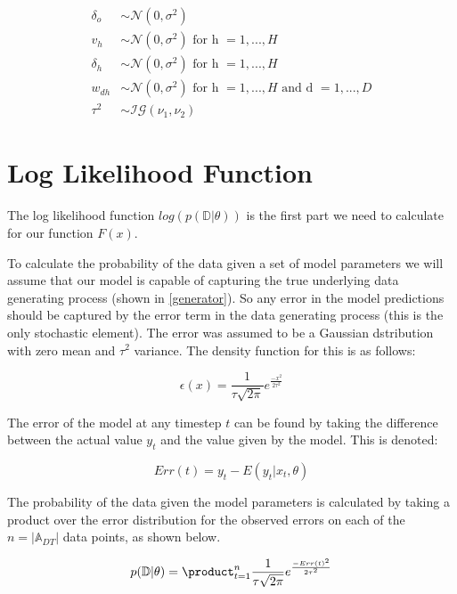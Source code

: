 \documentclass[12pt,a4paper]{article}
\numberwithin{equation}{section}
\begin{document}
\begin{align*}
\delta_o	&\sim \mathcal{N}(0, \sigma^2) \\
v_h 		&\sim \mathcal{N}(0, \sigma^2) \text{ for h }= 1,...,H \\
\delta_h 	&\sim \mathcal{N}(0, \sigma^2) \text{ for h }= 1,...,H \\
w_{dh} 		&\sim \mathcal{N}(0, \sigma^2) \text{ for h }= 1,...,H\text{ and d }= 1,...,D\\
\tau^2 		&\sim \mathcal{IG}(\nu_1, \nu_2)
\end{align*}

\section{Log Likelihood Function}

The log likelihood function $log(p(\mathbb{D} | \theta))$ is the first part we need to calculate for our function $F(x)$.

To calculate the probability of the data given a set of model parameters we will assume that our model is capable of capturing
the true underlying data generating process (shown in \ref{generator}). So any error in the model predictions should be captured by the
error term in the data generating process (this is the only stochastic element). 
The error was assumed to be a Gaussian dstribution with zero mean and $\tau^2$ variance. The density function for this is as follows:
 
\begin{equation}
\epsilon(x) = \frac{1}{\tau \sqrt{2\pi}} e^{\frac{-x^2}{2\tau^2}}
\end{equation}

The error of the model at any timestep $t$ can be found by taking the difference between the actual value $y_t$ and
the value given by the model. This is denoted:

\begin{equation}
Err(t) = y_t - E(y_t | x_t, \theta)
\end{equation}

The probability of the data given the model parameters is calculated by taking a product over 
the error distribution for the observed errors on each of the $n = |\mathbb{A}_{DT}|$ data 
points, as shown below.

\begin{equation}
p(\mathbb{D} | \theta) = \product_{t=1}^n \frac{1}{\tau \sqrt{2\pi}} e^{\frac{-Err(t)^2}{2\tau^2}}
\end{equation}
\end{document}
